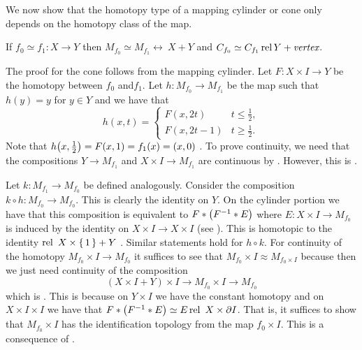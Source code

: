 \documentclass[letterpaper, 11pt, oneside]{book}
\begin{document}
\clearpage

We now show that the homotopy type of a mapping cylinder or cone only depends on the homotopy class of the map.

\begin{thrm}\label{thrm: homotopy_on_map_cyl_class_of_map}
  If $f_{0} \simeq f_{1}\colon X \to Y$ then $M_{f_{0}} \simeq M_{f_{1}} \rel\ X + Y$ and $C_{f_{0}} \simeq C_{f_{1}} \operatorname{rel} Y + \emph{vertex}$.
\end{thrm}
\begin{pf}
  The proof for the cone follows from the mapping cylinder.
  Let $F\colon X \times I \to Y$ be the homotopy between $f_{0}$ and$ f_{1}$.
  Let $h\colon M_{f_{0}} \to M_{f_{1}}$ be the map such that $h(y) = y$ for $y \in Y$ and we have that
  \[
    h(x, t) = \begin{cases}
                F(x, 2t) & t \leq \frac{1}{2}, \\
                F(x, 2t - 1) & t \geq \frac{1}{2}.
              \end{cases}
  \]
  Note that $h\pqty{x, \frac{1}{2}} = F(x, 1) = f_{1}(x) = (x, 0)$ .
  To prove continuity, we need that the compositions $Y \to M_{f_{1}}$ and $X \times I \to M_{f_{1}}$ are continuous by .
  However, this is .

  Let $k\colon M_{f_{1}} \to M_{f_{0}}$ be defined analogously.
  Consider the composition $k \circ h\colon M_{f_{0}} \to M_{f_{0}}$.
  This is clearly the identity on $Y$.
  On the cylinder portion we have that this composition is equivalent to $F * \pqty{F^{-1} * E}$ where $E\colon X \times I \to M_{f_{0}}$ is induced by the identity on $X \times I \to X \times I$ (see ).
  This is homotopic to the identity $\operatorname{rel}\ X \times \set{1} + Y$ .
  Similar statements hold for $h \circ k$.
  For continuity of the homotopy $M_{f_{0}} \times I \to M_{f_{0}}$ it suffices to see that $M_{f_{0}} \times I \approx M_{f_{0} \times I}$ because then we just need continuity of the composition
  \[
    (X \times I + Y) \times I \to M_{f_{0}} \times I \to M_{f_{0}}
  \]
  which is .
  This is because on $Y \times I$ we have the constant homotopy and on $X \times I \times I$ we have that $F * \pqty{F^{-1} * E} \simeq E \rel\ X \times \partial I$.
  That is, it suffices to show that $M_{f_{0}} \times I$ has the identification topology from the map $f_{0} \times I$.
  This is a consequence of .


\end{pf}
\end{document}
